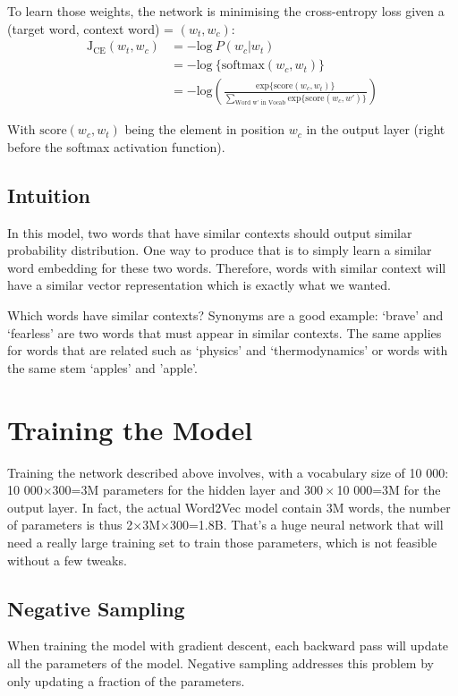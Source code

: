 To learn those weights, the network is minimising the cross-entropy loss given a (target word, context word) = $(w_t, w_c)$:
\begin{align}
    \text{J}_{\text{CE}}(w_t, w_c)   &=  -\text{log}~P(w_c | w_t) \nonumber\\
    &= -\text{log}~\{\text{softmax}(w_c, w_t)\}\nonumber\\
    &= -\text{log}\left(\frac{\text{exp}\{\text{score}(w_c, w_t)\}}{\sum_{\text{Word w' in Vocab}}\text{exp}\{\text{score}(w_c, w')\}} \right)
    \label{cross-entropy}
\end{align}

With $\text{score}(w_c, w_t)$ being the element in position $w_c$ in the output layer (right before the softmax activation function).

\subsection{Intuition}
In this model, two words that have similar contexts should output similar probability distribution. One way to produce that is to simply learn a similar word embedding for these two words. Therefore, words with similar context will have a similar vector representation which is exactly what we wanted.

Which words have similar contexts? Synonyms are a good example: `brave' and `fearless' are two words that must appear in similar contexts. The same applies for words that are related such as `physics' and `thermodynamics' or words with the same stem `apples' and 'apple'. 

\section{Training the Model}
Training the network described above involves, with a vocabulary size of 10 000: 10 000$\times300$=3M parameters for the hidden layer and $300\times$10 000=3M for the output layer. In fact, the actual Word2Vec model contain 3M words, the number of parameters is thus 2$\times$3M$\times$300=1.8B. That's a huge neural network that will need a really large training set to train those parameters, which is not feasible without a few tweaks.

\subsection{Negative Sampling}
When training the model with gradient descent, each backward pass will update all the parameters of the model. Negative sampling addresses this problem by only updating a fraction of the parameters.

